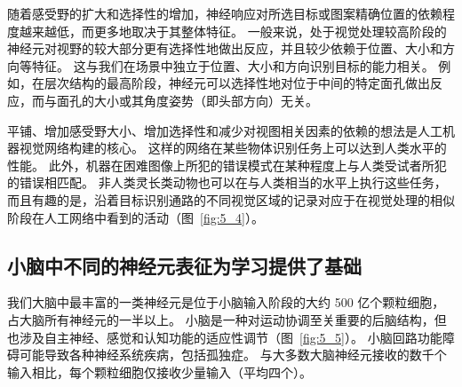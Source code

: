 随着感受野的扩大和选择性的增加，神经响应对所选目标或图案精确位置的依赖程度越来越低，而更多地取决于其整体特征。
一般来说，处于视觉处理较高阶段的神经元对视野的较大部分更有选择性地做出反应，并且较少依赖于位置、大小和方向等特征。
这与我们在场景中独立于位置、大小和方向识别目标的能力相关。
例如，在层次结构的最高阶段，神经元可以选择性地对位于中间的特定面孔做出反应，而与面孔的大小或其角度姿势（即头部方向）无关。


平铺、增加感受野大小、增加选择性和减少对视图相关因素的依赖的想法是人工机器视觉网络构建的核心。
这样的网络在某些物体识别任务上可以达到人类水平的性能。
此外，机器在困难图像上所犯的错误模式在某种程度上与人类受试者所犯的错误相匹配。
非人类灵长类动物也可以在与人类相当的水平上执行这些任务，而且有趣的是，沿着目标识别通路的不同视觉区域的记录对应于在视觉处理的相似阶段在人工网络中看到的活动（图~\ref{fig:5_4}）。



\subsection{小脑中不同的神经元表征为学习提供了基础}

我们大脑中最丰富的一类神经元是位于小脑输入阶段的大约 500 亿个颗粒细胞，占大脑所有神经元的一半以上。 
小脑是一种对运动协调至关重要的后脑结构，但也涉及自主神经、感觉和认知功能的适应性调节（图~\ref{fig:5_5}）。
小脑回路功能障碍可能导致各种神经系统疾病，包括孤独症。
与大多数大脑神经元接收的数千个输入相比，每个颗粒细胞仅接收少量输入（平均四个）。


